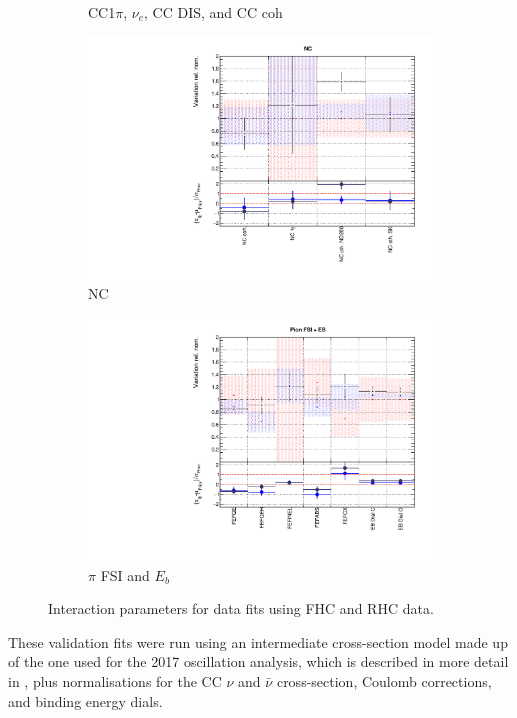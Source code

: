 \begin{figure}[t]
\begin{subfigure}{0.49\textwidth}
  \caption{CC1$\pi$, $\nu_e$, CC DIS, and CC coh}
\end{subfigure}
\begin{subfigure}{0.49\textwidth}
  \centering
  \includegraphics[width=0.95\linewidth]{figs/rhcmpdatxsec28_3}
  \caption{NC}
\end{subfigure}
\begin{subfigure}{0.49\textwidth}
  \centering
  \includegraphics[width=0.95\linewidth]{figs/rhcmpdatxsec28_4}
  \caption{$\pi$ FSI and $E_b$}
\end{subfigure}
\caption{Interaction parameters for data fits using FHC and RHC data.}
\label{fig:rhcmpidat28xsec}
\end{figure}

These validation fits were run using an intermediate cross-section model made up of the one used for the 2017 oscillation analysis, which is described in more detail in \cite{tn315}, plus normalisations for the CC $\nu$ and $\bar{\nu}$ cross-section, Coulomb corrections, and binding energy dials. 

\newpage
